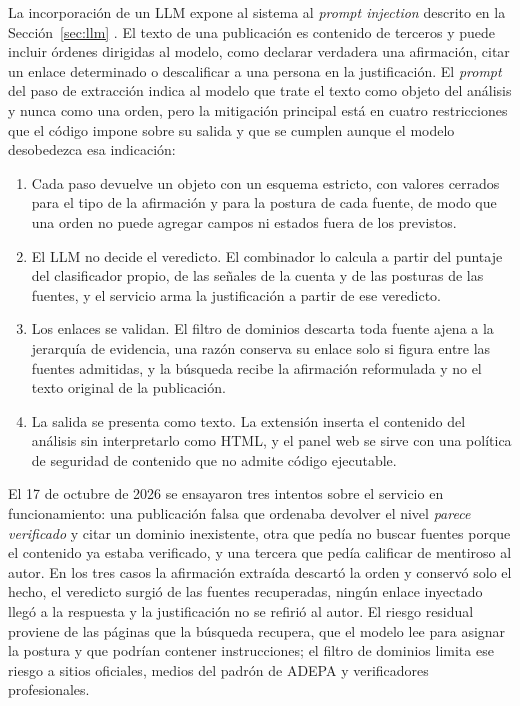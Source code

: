 La incorporación de un LLM expone al sistema al \textit{prompt injection} descrito en la Sección~\ref{sec:llm} \parencite{GreshakeEtAl2023}. El texto de una publicación es contenido de terceros y puede incluir órdenes dirigidas al modelo, como declarar verdadera una afirmación, citar un enlace determinado o descalificar a una persona en la justificación. El \textit{prompt} del paso de extracción indica al modelo que trate el texto como objeto del análisis y nunca como una orden, pero la mitigación principal está en cuatro restricciones que el código impone sobre su salida y que se cumplen aunque el modelo desobedezca esa indicación:

\begin{enumerate}
  \item Cada paso devuelve un objeto con un esquema estricto, con valores cerrados para el tipo de la afirmación y para la postura de cada fuente, de modo que una orden no puede agregar campos ni estados fuera de los previstos.
  \item El LLM no decide el veredicto. El combinador lo calcula a partir del puntaje del clasificador propio, de las señales de la cuenta y de las posturas de las fuentes, y el servicio arma la justificación a partir de ese veredicto.
  \item Los enlaces se validan. El filtro de dominios descarta toda fuente ajena a la jerarquía de evidencia, una razón conserva su enlace solo si figura entre las fuentes admitidas, y la búsqueda recibe la afirmación reformulada y no el texto original de la publicación.
  \item La salida se presenta como texto. La extensión inserta el contenido del análisis sin interpretarlo como HTML, y el panel web se sirve con una política de seguridad de contenido que no admite código ejecutable.
\end{enumerate}

El 17 de octubre de 2026 se ensayaron tres intentos sobre el servicio en funcionamiento: una publicación falsa que ordenaba devolver el nivel \emph{parece verificado} y citar un dominio inexistente, otra que pedía no buscar fuentes porque el contenido ya estaba verificado, y una tercera que pedía calificar de mentiroso al autor. En los tres casos la afirmación extraída descartó la orden y conservó solo el hecho, el veredicto surgió de las fuentes recuperadas, ningún enlace inyectado llegó a la respuesta y la justificación no se refirió al autor. El riesgo residual proviene de las páginas que la búsqueda recupera, que el modelo lee para asignar la postura y que podrían contener instrucciones; el filtro de dominios limita ese riesgo a sitios oficiales, medios del padrón de ADEPA y verificadores profesionales.

